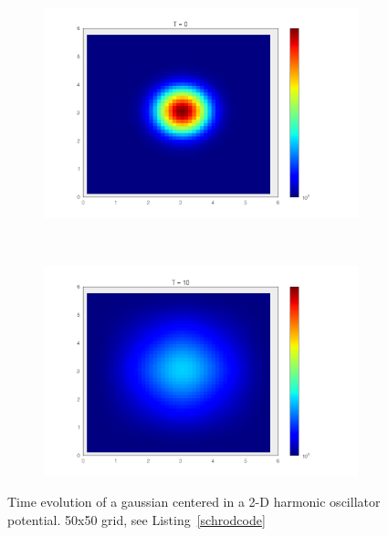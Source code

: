\documentclass[paper=a4, fontsize=11pt, abstract=on]{scrartcl} %
\numberwithin{equation}{section}
\numberwithin{figure}{section}
\numberwithin{table}{section}
\begin{document}
\begin{figure}
  \centering
  \begin{subfigure}[b]{0.65\textwidth}
    \includegraphics[width=\textwidth]{T00}
    \label{fig:harm1}
  \end{subfigure}
  ~
  \begin{subfigure}[b]{0.65\textwidth}
    \includegraphics[width=\textwidth]{T10}
    \label{fig:harm2}
  \end{subfigure}
  \caption{Time evolution of a gaussian centered in a 2-D harmonic oscillator potential. 50x50 grid, see Listing~\ref{schrodcode}}
  \label{fig:harm}
\end{figure}
\end{document}
